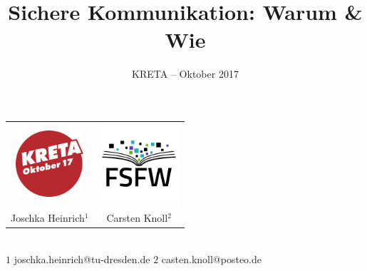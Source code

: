 \documentclass{beamer}
\title{Sichere Kommunikation: Warum \& Wie}
\subtitle{KRETA – Oktober 2017}
\begin{document}
\begin{frame}
  \begin{center}
    \begin{tabularx}{7cm}{cc}
      \includegraphics[width=2.5cm]{img-src/kreta-logo.png}&
      \includegraphics[width=3cm]{img-src/fsfw-logo-with-text.pdf}\\
      Joschka Heinrich${}^{1}$&
      Carsten Knoll${}^{2}$
    \end{tabularx}

    \vspace*{2\baselineskip}

    \parbox{.95\columnwidth}{\centering\Large\inserttitle}

    \vspace*{\baselineskip}

    \structure{\large \insertsubtitle}

  \end{center}

  ~\\[5mm]
  {\tiny $1$ joschka.heinrich@tu-dresden.de \qquad $2$ casten.knoll@posteo.de}
\end{frame}


\end{document}
